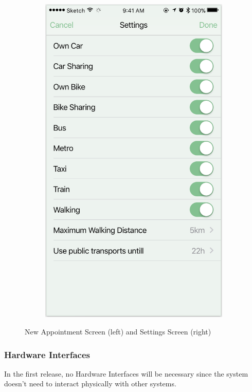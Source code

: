 \documentclass[12pt]{article}
\begin{document}
\begin{figure}[H]
\begin{subfigure}{.4\textwidth}
        \includegraphics[scale=0.465]{interfaceSettings.png}
        \label{fig:settingsScreen}
    \end{subfigure}
    \caption{New Appointment Screen (left) and Settings Screen (right)}
\end{figure}


\subsubsection{Hardware Interfaces}
In the first release, no Hardware Interfaces will be necessary since the system doesn't need to interact physically with other systems.
\end{document}
